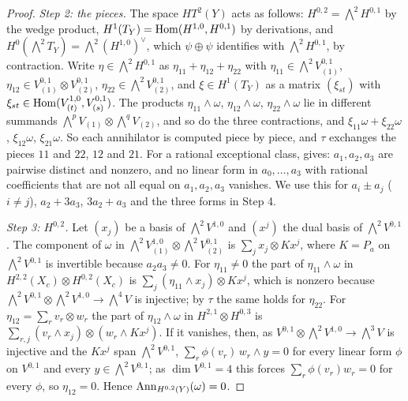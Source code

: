 \begin{proof}
\emph{Step 2: the pieces.} The space $HT^{2}(Y)$ acts as follows:
$H^{0,2}={\textstyle\bigwedge^{2}}H^{0,1}$ by the wedge product,
$H^{1}(T_{Y})=\operatorname{Hom}(H^{1,0},H^{0,1})$ by derivations, and
$H^{0}({\textstyle\bigwedge^{2}}T_{Y})={\textstyle\bigwedge^{2}}(H^{1,0})^{\vee}$,
which $\psi\oplus\psi$ identifies with ${\textstyle\bigwedge^{2}}H^{0,1}$, by
contraction. Write $\eta\in{\textstyle\bigwedge^{2}}H^{0,1}$ as
$\eta_{11}+\eta_{12}+\eta_{22}$ with $\eta_{11}\in{\textstyle\bigwedge^{2}}
V^{0,1}_{(1)}$, $\eta_{12}\in V^{0,1}_{(1)}\otimes V^{0,1}_{(2)}$,
$\eta_{22}\in{\textstyle\bigwedge^{2}}V^{0,1}_{(2)}$, and $\xi\in H^{1}(T_{Y})$
as a matrix $(\xi_{st})$ with $\xi_{st}\in\operatorname{Hom}(V^{1,0}_{(t)},V^{0,1}_{(s)})$.
The products $\eta_{11}\wedge\omega$, $\eta_{12}\wedge\omega$,
$\eta_{22}\wedge\omega$ lie in different summands
${\textstyle\bigwedge^{p}}V_{(1)}\otimes{\textstyle\bigwedge^{q}}V_{(2)}$, and so
do the three contractions, and $\xi_{11}\omega+\xi_{22}\omega$, $\xi_{12}\omega$,
$\xi_{21}\omega$. So each annihilator is computed piece by piece, and $\tau$
exchanges the pieces $11$ and $22$, $12$ and $21$. For a rational exceptional
class,  gives: $a_{1},a_{2},a_{3}$ are pairwise distinct
and nonzero, and no linear form in $a_{0},\dots,a_{3}$ with rational
coefficients that are not all equal on $a_{1},a_{2},a_{3}$ vanishes. We use
this for $a_{i}\pm a_{j}$ ($i\ne j$), $a_{2}+3a_{3}$, $3a_{2}+a_{3}$ and the
three forms in Step 4.

\emph{Step 3: $H^{0,2}$.} Let $(x_{j})$ be a basis of
${\textstyle\bigwedge^{2}}V^{1,0}$ and $(x^{j})$ the dual basis of
${\textstyle\bigwedge^{2}}V^{0,1}$. The component of $\omega$ in
${\textstyle\bigwedge^{2}}V^{1,0}_{(1)}\otimes{\textstyle\bigwedge^{2}}
V^{0,1}_{(2)}$ is $\sum_{j}x_{j}\otimes Kx^{j}$, where $K=P_{a}$ on
${\textstyle\bigwedge^{2}}V^{0,1}$ is invertible because $a_{2}a_{3}\ne0$. For
$\eta_{11}\ne0$ the part of $\eta_{11}\wedge\omega$ in
$H^{2,2}(X_{c})\otimes H^{0,2}(X_{c})$ is $\sum_{j}(\eta_{11}\wedge x_{j})
\otimes Kx^{j}$, which is nonzero because ${\textstyle\bigwedge^{2}}V^{0,1}
\otimes{\textstyle\bigwedge^{2}}V^{1,0}\to{\textstyle\bigwedge^{4}}V$ is
injective; by $\tau$ the same holds for $\eta_{22}$. For
$\eta_{12}=\sum_{r}v_{r}\otimes w_{r}$ the part of $\eta_{12}\wedge\omega$ in
$H^{2,1}\otimes H^{0,3}$ is $\sum_{r,j}(v_{r}\wedge x_{j})\otimes
(w_{r}\wedge Kx^{j})$. If it vanishes, then, as $V^{0,1}\otimes
{\textstyle\bigwedge^{2}}V^{1,0}\to{\textstyle\bigwedge^{3}}V$ is injective and
the $Kx^{j}$ span ${\textstyle\bigwedge^{2}}V^{0,1}$,
$\sum_{r}\phi(v_{r})\,w_{r}\wedge y=0$ for every linear form $\phi$ on
$V^{0,1}$ and every $y\in{\textstyle\bigwedge^{2}}V^{0,1}$; as
$\dim V^{0,1}=4$ this forces $\sum_{r}\phi(v_{r})w_{r}=0$ for every $\phi$,
so $\eta_{12}=0$. Hence $\operatorname{Ann}_{H^{0,2}(Y)}(\omega)=0$.


\end{proof}
